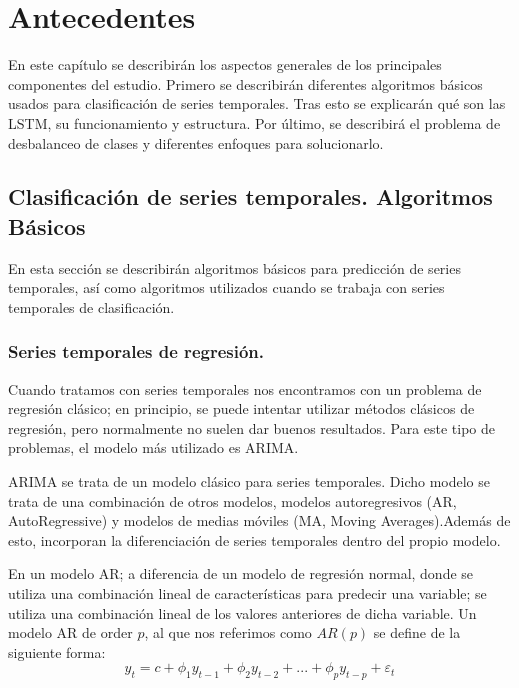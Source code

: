 \chapter{Antecedentes}
En este capítulo se describirán los aspectos generales de los principales componentes del estudio. Primero se describirán diferentes algoritmos básicos usados para clasificación de series temporales. Tras esto se explicarán qué son las LSTM, su funcionamiento y estructura. Por último, se describirá el problema de desbalanceo de clases y diferentes enfoques para solucionarlo.\newline

\section{Clasificación de series temporales. Algoritmos Básicos}
En esta sección se describirán algoritmos básicos para predicción de series temporales, así como algoritmos utilizados cuando se trabaja con series temporales de clasificación.\newline

\subsection{Series temporales de regresión.}
Cuando tratamos con series temporales nos encontramos con un problema de regresión clásico; en principio, se puede intentar utilizar métodos clásicos de regresión, pero normalmente no suelen dar buenos resultados. Para este tipo de problemas, el modelo más utilizado es ARIMA.\newline

ARIMA se trata de un modelo clásico para series temporales. Dicho modelo se trata de una combinación de otros modelos, modelos autoregresivos (AR, AutoRegressive) y modelos de medias móviles (MA, Moving Averages).Además de esto, incorporan la diferenciación de series temporales dentro del propio modelo.\newline

En un modelo AR; a diferencia de un modelo de regresión normal, donde se utiliza una combinación lineal de características para predecir una variable; se utiliza una combinación lineal de los valores anteriores de dicha variable. Un modelo AR de order $p$, al que nos referimos como $AR(p)$ se define de la siguiente forma:\newline
$$ y_t = c + \phi_1 y_{t-1} + \phi_2 y_{t-2} + ... + \phi_p y_{t-p} + \varepsilon_t $$

